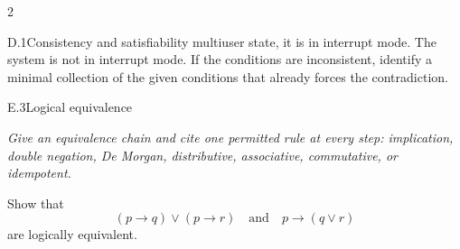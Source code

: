 \documentclass[9pt]{extarticle}
\begin{document}
\begin{multicols}{2}
\begin{CoreProblem}{D.1}{Consistency and satisfiability}
multiuser state, it is in interrupt mode. The system is not in interrupt mode.
If the conditions are inconsistent, identify a minimal collection of the given
conditions that already forces the contradiction.
\end{CoreProblem}
\begin{CoreProblem}{E.3}{Logical equivalence}
{\scriptsize\textit{Give an equivalence chain and cite one permitted rule at every step: implication, double negation, De Morgan, distributive, associative, commutative, or idempotent.}\par}
Show that
\[
  (p\to q)\lor(p\to r)
  \quad\text{and}\quad
  p\to(q\lor r)
\]
are logically equivalent.
\end{CoreProblem}
\end{multicols}
\CoreWorkArea
\end{document}
